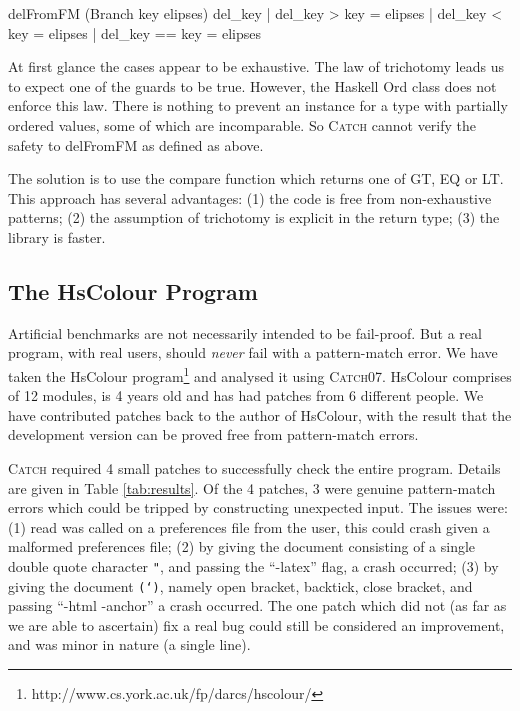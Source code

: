 \documentclass[preprint]{sigplanconf}
\newcommand{\T}[1]{\texttt{#1}}
\newcommand{\C}[1]{\textsf{#1}}
\newcommand{\catch}{\textsc{Catch}}
\newcommand{\newtool}{\catch07}
\begin{document}
\begin{code}
delFromFM (Branch key elipses) del_key  | del_key  >   key = elipses
                                        | del_key  <   key = elipses
                                        | del_key  ==  key = elipses
\end{code}

At first glance the cases appear to be exhaustive. The law of trichotomy leads us to expect one of the guards to be true. However, the Haskell \C{Ord} class does not enforce this law. There is nothing to prevent an instance for a type with partially ordered values, some of which are incomparable. So \catch{} cannot verify the safety to \C{delFromFM} as defined as above.

The solution is to use the \C{compare} function which returns one of \C{GT}, \C{EQ} or \C{LT}. This approach has several advantages: (1) the code is free from non-exhaustive patterns; (2) the assumption of trichotomy is explicit in the return type; (3) the library is faster.


\subsection{The HsColour Program}
\label{sec:hscolour}

Artificial benchmarks are not necessarily intended to be fail-proof. But a real program, with real users, should \textit{never} fail with a pattern-match error. We have taken the HsColour program\footnote{http://www.cs.york.ac.uk/fp/darcs/hscolour/} and analysed it using \newtool{}. HsColour comprises of 12 modules, is 4 years old and has had patches from 6 different people.
We have contributed patches back to the author of HsColour, with the result that the development version can be proved free from pattern-match errors.

\catch{} required 4 small patches to successfully check the entire program. Details are given in Table \ref{tab:results}. Of the 4 patches, 3 were genuine pattern-match errors which could be tripped by constructing unexpected input. The issues were: (1) \C{read} was called on a preferences file from the user, this could crash given a malformed preferences file; (2) by giving the document consisting of a single double quote character \T{"}, and passing the ``-latex'' flag, a crash occurred; (3) by giving the document \T{(`)}, namely open bracket, backtick, close bracket, and passing ``-html -anchor'' a crash occurred. The one patch which did not (as far as we are able to ascertain) fix a real bug could still be considered an improvement, and was minor in nature (a single line).
\end{document}
